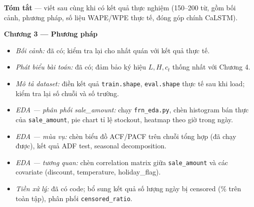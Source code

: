 \documentclass[12pt,a4paper]{report}
\newcommand{\ownerTT}{\colorbox{red!15}{\textbf{[TT] Thanh Tài}}}
\begin{document}
\bigskip

\begin{tcolorbox}[colback=red!4, colframe=red!55!black,
    title=\bfseries \ownerTT\ — Nhiệm vụ chi tiết (Người nắm chính)]

\textbf{Tóm tắt} — viết sau cùng khi có kết quả thực nghiệm (150–200 từ, gồm bối cảnh, phương pháp, số liệu WAPE/WPE thực tế, đóng góp chính CaLSTM).

\medskip
\textbf{Chương 3 — Phương pháp}
\begin{itemize}[leftmargin=1.5em, itemsep=1pt]
    \item[\S3.1] \textit{Bối cảnh:} đã có; kiểm tra lại cho nhất quán với kết quả thực tế.
    \item[\S3.2] \textit{Phát biểu bài toán:} đã có; đảm bảo ký hiệu $L, H, c_t$ thống nhất với Chương 4.
    \item[\S3.3] \textit{Mô tả dataset:} điền kết quả \texttt{train.shape}, \texttt{eval.shape} thực tế sau khi load; kiểm tra lại số chuỗi và số trường.
    \item[\S3.4] \textit{EDA --- phân phối sale\_amount:} chạy \texttt{frn\_eda.py}, chèn histogram bán thực của \texttt{sale\_amount}, pie chart tỉ lệ stockout, heatmap theo giờ trong ngày.
    \item[\S3.4] \textit{EDA --- mùa vụ:} chèn biểu đồ ACF/PACF trên chuỗi tổng hợp (đã chạy được), kết quả ADF test, seasonal decomposition.
    \item[\S3.4] \textit{EDA --- tương quan:} chèn correlation matrix giữa \texttt{sale\_amount} và các covariate (discount, temperature, holiday\_flag).
    \item[\S3.5] \textit{Tiền xử lý:} đã có code; bổ sung kết quả số lượng ngày bị censored (\% trên toàn tập), phân phối \texttt{censored\_ratio}.
\end{itemize}


\end{tcolorbox}
\end{document}
